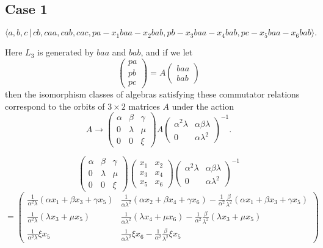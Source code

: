 \documentclass[10pt,thmsa]{article}
\begin{document}
\subsection{Case 1}

\[
\langle
a,b,c\,|%
\,cb,caa,cab,cac,pa-x_{1}baa-x_{2}bab,pb-x_{3}baa-x_{4}bab,pc-x_{5}baa-x_{6}bab\rangle . 
\]

Here $L_{3}$ is generated by $baa$ and $bab$, and if we let 
\[
\left( 
\begin{array}{l}
pa \\ 
pb \\ 
pc%
\end{array}%
\right) =A\left( 
\begin{array}{l}
baa \\ 
bab%
\end{array}%
\right) 
\]%
then the isomorphism classes of algebras satisfying these commutator
relations correspond to the orbits of $3\times 2$ matrices $A$ under the
action 
\[
A\rightarrow \left( 
\begin{array}{lll}
\alpha & \beta & \gamma \\ 
0 & \lambda & \mu \\ 
0 & 0 & \xi%
\end{array}%
\right) A\left( 
\begin{array}{ll}
\alpha ^{2}\lambda & \alpha \beta \lambda \\ 
0 & \alpha \lambda ^{2}%
\end{array}%
\right) ^{-1}. 
\]

\bigskip 
\[
\left( 
\begin{array}{lll}
\alpha & \beta & \gamma \\ 
0 & \lambda & \mu \\ 
0 & 0 & \xi%
\end{array}%
\right) \left( 
\begin{array}{cc}
x_{1} & x_{2} \\ 
x_{3} & x_{4} \\ 
x_{5} & x_{6}%
\end{array}%
\right) \left( 
\begin{array}{ll}
\alpha ^{2}\lambda & \alpha \beta \lambda \\ 
0 & \alpha \lambda ^{2}%
\end{array}%
\right) ^{-1} 
\]%
\[
=\left( 
\begin{array}{cc}
\frac{1}{\alpha ^{2}\lambda }\left( \alpha x_{1}+\beta x_{3}+\gamma
x_{5}\right) & \frac{1}{\alpha \lambda ^{2}}\left( \alpha x_{2}+\beta
x_{4}+\gamma x_{6}\right) -\frac{1}{\alpha ^{2}}\frac{\beta }{\lambda ^{2}}%
\left( \alpha x_{1}+\beta x_{3}+\gamma x_{5}\right) \\ 
\frac{1}{\alpha ^{2}\lambda }\left( \lambda x_{3}+\mu x_{5}\right) & \frac{1%
}{\alpha \lambda ^{2}}\left( \lambda x_{4}+\mu x_{6}\right) -\frac{1}{\alpha
^{2}}\frac{\beta }{\lambda ^{2}}\left( \lambda x_{3}+\mu x_{5}\right) \\ 
\frac{1}{\alpha ^{2}\lambda }\xi x_{5} & \frac{1}{\alpha \lambda ^{2}}\xi
x_{6}-\frac{1}{\alpha ^{2}}\frac{\beta }{\lambda ^{2}}\xi x_{5}%
\end{array}%
\right) 
\]%
$\allowbreak $
\end{document}
